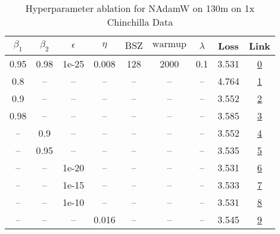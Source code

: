 \begin{table}[H]
\centering
\caption{Hyperparameter ablation for NAdamW on 130m on 1x Chinchilla Data}
\label{tab:ablation_nadamw_130m_1}
\begin{tabular}{ccccccccc}
\toprule
$\beta_1$ & $\beta_2$ & $\epsilon$ & $\eta$ & $\mathrm{BSZ}$ & $\mathrm{warmup}$ & $\lambda$ & Loss & Link \\
\midrule
0.95 & 0.98 & 1e-25 & 0.008 & 128 & 2000 & 0.1 & 3.531 & \href{https://wandb.ai/stanford-mercury/optimizer-scaling/runs/sweep-130m-2B-nadamw2de195lr0.008-wd0.1-minlr0-warmup2000-b10.95-437e7c}{0} \\
\midrule
0.8 & -- & -- & -- & -- & -- & -- & 4.764 & \href{https://wandb.ai/stanford-mercury/optimizer-scaling/runs/sweep-130m-2B-nadamw434949lr0.008-wd0.1-minlr0-warmup2000-b10.8--08f271}{1} \\
0.9 & -- & -- & -- & -- & -- & -- & 3.552 & \href{https://wandb.ai/stanford-mercury/optimizer-scaling/runs/sweep-130m-2B-nadamwd53b3flr0.008-wd0.1-minlr0-warmup2000-b10.9--c3b202}{2} \\
0.98 & -- & -- & -- & -- & -- & -- & 3.585 & \href{https://wandb.ai/stanford-mercury/optimizer-scaling/runs/sweep-130m-2B-nadamw2aa7d8lr0.008-wd0.1-minlr0-warmup2000-b10.98-d13a84}{3} \\
-- & 0.9 & -- & -- & -- & -- & -- & 3.552 & \href{https://wandb.ai/stanford-mercury/optimizer-scaling/runs/sweep-130m-2B-nadamw8079eflr0.008-wd0.1-minlr0-warmup2000-b10.95-da3b17}{4} \\
-- & 0.95 & -- & -- & -- & -- & -- & 3.535 & \href{https://wandb.ai/stanford-mercury/optimizer-scaling/runs/sweep-130m-2B-nadamwf5b595lr0.008-wd0.1-minlr0-warmup2000-b10.95-538632}{5} \\
-- & -- & 1e-20 & -- & -- & -- & -- & 3.531 & \href{https://wandb.ai/stanford-mercury/optimizer-scaling/runs/sweep-130m-2B-nadamwf2ca74lr0.008-wd0.1-minlr0-warmup2000-b10.95-d57343}{6} \\
-- & -- & 1e-15 & -- & -- & -- & -- & 3.533 & \href{https://wandb.ai/stanford-mercury/optimizer-scaling/runs/sweep-130m-2B-nadamwd2c0fblr0.008-wd0.1-minlr0-warmup2000-b10.95-142d0c}{7} \\
-- & -- & 1e-10 & -- & -- & -- & -- & 3.531 & \href{https://wandb.ai/stanford-mercury/optimizer-scaling/runs/sweep-130m-2B-nadamw96aba0lr0.008-wd0.1-minlr0-warmup2000-b10.95-2ac247}{8} \\
-- & -- & -- & 0.016 & -- & -- & -- & 3.545 & \href{https://wandb.ai/stanford-mercury/optimizer-scaling/runs/sweep-130m-2B-nadamw159eedlr0.016-wd0.1-minlr0-warmup2000-b10.95-28f35b}{9} \\

\end{tabular}
\end{table}

